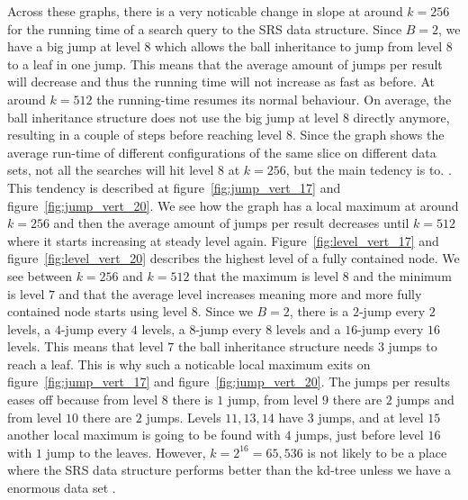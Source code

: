 Across these graphs, there is a very noticable change in slope at around $k=256$ for the running time of a search query to the SRS data structure. Since $B=2$, we have a big jump at level $8$ which allows the ball inheritance to jump from level $8$ to a leaf in one jump. This means that the average amount of jumps per result will decrease and thus the running time will not increase as fast as before. At around $k=512$ the running-time resumes its normal behaviour. On average, the ball inheritance structure does not use the big jump at level $8$ directly anymore, resulting in a couple of steps before reaching level $8$. Since the graph shows the average run-time of different configurations of the same slice on different data sets, not all the searches will hit level $8$ at $k=256$, but the main tedency is to. . This tendency is described at figure~\ref{fig:jump_vert_17} and figure~\ref{fig:jump_vert_20}. We see how the graph has a local maximum at around $k=256$ and then the average amount of jumps per result decreases until $k=512$ where it starts increasing at steady level again. Figure~\ref{fig:level_vert_17} and figure~\ref{fig:level_vert_20} describes the highest level of a fully contained node. We see between $k=256$ and $k=512$ that the maximum is level $8$ and the minimum is level $7$ and that the average level increases meaning more and more fully contained node starts using level $8$. Since we $B=2$, there is a $2$-jump every $2$ levels, a $4$-jump every $4$ levels, a $8$-jump every $8$ levels and a $16$-jump every $16$ levels. This means that level $7$ the ball inheritance structure needs $3$ jumps to reach a leaf. This is why such a noticable local maximum exits on figure~\ref{fig:jump_vert_17} and figure~\ref{fig:jump_vert_20}. The jumps per results eases off because from level $8$ there is $1$ jump, from level $9$ there are $2$ jumps and from level $10$ there are $2$ jumps. Levels $11, 13, 14$ have $3$ jumps, and at level $15$ another local maximum is going to be found with $4$ jumps, just before level $16$ with $1$ jump to the leaves. However, $k=2^{16}=65,536$ is not likely to be a place where the SRS data structure performs better than the kd-tree unless we have a enormous data set . 



